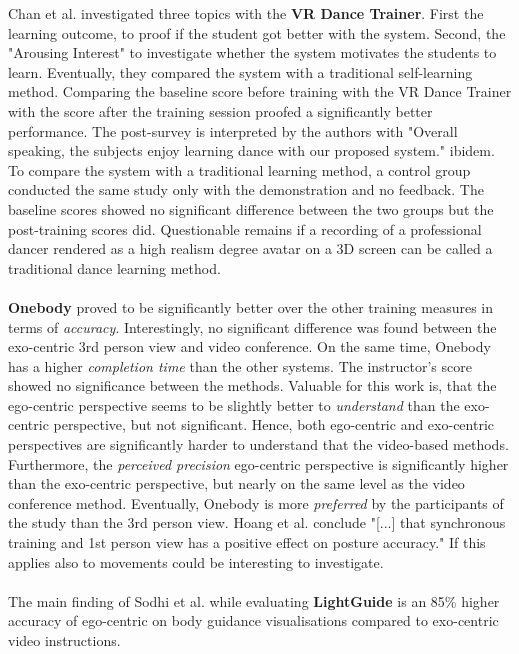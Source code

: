 Chan et al. \cite{Chan2010} investigated three topics with the \textbf{VR Dance Trainer}. First the learning outcome, to proof if the student got better with the system. Second, the "Arousing Interest" to investigate whether the system motivates the students to learn. Eventually, they compared the system with a traditional self-learning method. Comparing the baseline score before training with the VR Dance Trainer with the score after the training session proofed a significantly better performance. The post-survey is interpreted by the authors with "Overall speaking, the subjects enjoy learning dance with our proposed system." ibidem. To compare the system with a traditional learning method, a control group conducted the same study only with the demonstration and no feedback. The baseline scores showed no significant difference between the two groups but the post-training scores did. Questionable remains if a recording of a professional dancer rendered as a high realism degree avatar on a 3D screen can be called a traditional dance learning method.\\ \\
\textbf{Onebody} \cite{Hoang2016} proved to be significantly better over the other training measures in terms of \textit{accuracy}. Interestingly, no significant difference was found between the exo-centric 3rd person view and video conference. On the same time, Onebody has a higher \textit{completion time} than the other systems. The instructor's score showed no significance between the methods. Valuable for this work is, that the ego-centric perspective seems to be slightly better to \textit{understand} than the exo-centric perspective, but not significant. Hence, both ego-centric and exo-centric perspectives are significantly harder to understand that the video-based methods. Furthermore, the \textit{perceived precision} ego-centric perspective is significantly higher than the exo-centric perspective, but nearly on the same level as the video conference method. Eventually, Onebody is more \textit{preferred} by the participants of the study than the 3rd person view. Hoang et al. conclude "[...] that synchronous training and 1st person view has a positive effect on posture accuracy."\cite{Hoang2016} If this applies also to movements could be interesting to investigate.\\ \\
The main finding of Sodhi et al. while evaluating \textbf{LightGuide} is an 85\% higher accuracy of ego-centric on body guidance visualisations compared to exo-centric video instructions.
